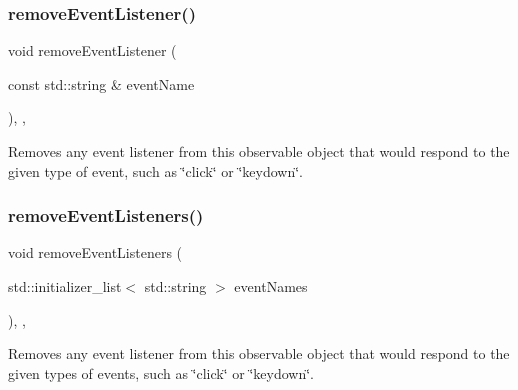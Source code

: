 \mbox{\label{classGObservable_acbcf1ed3a851ad8a3c17ef38d86b481d}} 
\subsubsection{\texorpdfstring{remove\+Event\+Listener()}{removeEventListener()}}
{\footnotesize\ttfamily void remove\+Event\+Listener (\begin{DoxyParamCaption}\item[{const std\+::string \&}]{event\+Name }\end{DoxyParamCaption})\hspace{0.3cm}{\ttfamily [protected]}, {\ttfamily [virtual]}, {\ttfamily [inherited]}}



Removes any event listener from this observable object that would respond to the given type of event, such as \char`\"{}click\char`\"{} or \char`\"{}keydown\char`\"{}. 

\mbox{\label{classGObservable_af51cc35c29a1bd1908609d432decdbb6}} 
\subsubsection{\texorpdfstring{remove\+Event\+Listeners()}{removeEventListeners()}}
{\footnotesize\ttfamily void remove\+Event\+Listeners (\begin{DoxyParamCaption}\item[{std\+::initializer\+\_\+list$<$ std\+::string $>$}]{event\+Names }\end{DoxyParamCaption})\hspace{0.3cm}{\ttfamily [protected]}, {\ttfamily [virtual]}, {\ttfamily [inherited]}}



Removes any event listener from this observable object that would respond to the given types of events, such as \char`\"{}click\char`\"{} or \char`\"{}keydown\char`\"{}. 

\mbox{\label{classGCanvas_a43095f41cab3be732b49f29970484b05}} 
